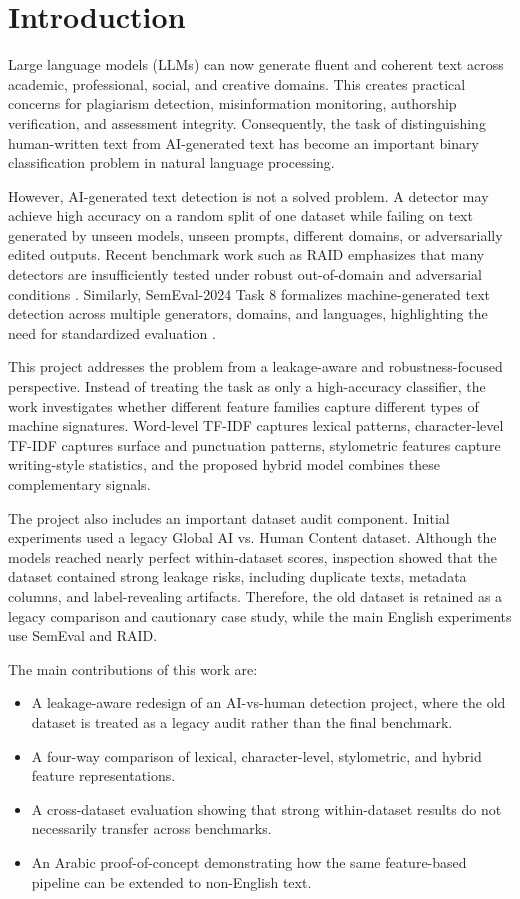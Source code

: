 \documentclass[conference]{IEEEtran}
\begin{document}
\section{Introduction}
Large language models (LLMs) can now generate fluent and coherent text across academic, professional, social, and creative domains. This creates practical concerns for plagiarism detection, misinformation monitoring, authorship verification, and assessment integrity. Consequently, the task of distinguishing human-written text from AI-generated text has become an important binary classification problem in natural language processing.

However, AI-generated text detection is not a solved problem. A detector may achieve high accuracy on a random split of one dataset while failing on text generated by unseen models, unseen prompts, different domains, or adversarially edited outputs. Recent benchmark work such as RAID emphasizes that many detectors are insufficiently tested under robust out-of-domain and adversarial conditions \cite{dugan2024raid}. Similarly, SemEval-2024 Task 8 formalizes machine-generated text detection across multiple generators, domains, and languages, highlighting the need for standardized evaluation \cite{wang2024semeval}.

This project addresses the problem from a leakage-aware and robustness-focused perspective. Instead of treating the task as only a high-accuracy classifier, the work investigates whether different feature families capture different types of machine signatures. Word-level TF-IDF captures lexical patterns, character-level TF-IDF captures surface and punctuation patterns, stylometric features capture writing-style statistics, and the proposed hybrid model combines these complementary signals.

The project also includes an important dataset audit component. Initial experiments used a legacy Global AI vs. Human Content dataset. Although the models reached nearly perfect within-dataset scores, inspection showed that the dataset contained strong leakage risks, including duplicate texts, metadata columns, and label-revealing artifacts. Therefore, the old dataset is retained as a legacy comparison and cautionary case study, while the main English experiments use SemEval and RAID.

The main contributions of this work are:
\begin{itemize}
    \item A leakage-aware redesign of an AI-vs-human detection project, where the old dataset is treated as a legacy audit rather than the final benchmark.
    \item A four-way comparison of lexical, character-level, stylometric, and hybrid feature representations.
    \item A cross-dataset evaluation showing that strong within-dataset results do not necessarily transfer across benchmarks.
    \item An Arabic proof-of-concept demonstrating how the same feature-based pipeline can be extended to non-English text.
\end{itemize}
\end{document}
